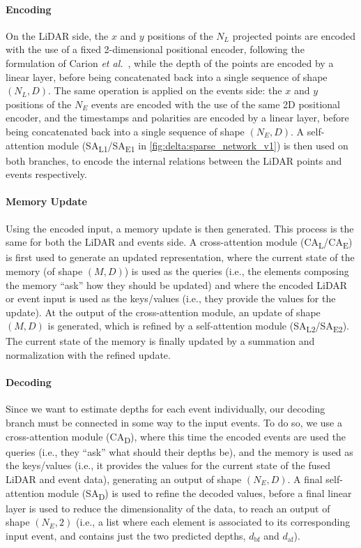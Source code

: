 \paragraph{Encoding}\label{sec:delta:sparse_network_v1:encoding}
On the LiDAR side, the \(x\) and \(y\) positions of the \(N_L\) projected points are encoded with the use of a fixed 2-dimensional positional encoder, following the formulation of Carion \textit{et al.}~\cite{Carion2020EndtoEndOD}, while the depth of the points are encoded by a linear layer, before being concatenated back into a single sequence of shape \((N_L, D)\). The same operation is applied on the events side: the \(x\) and \(y\) positions of the \(N_E\) events are encoded with the use of the same 2D positional encoder, and the timestamps and polarities are encoded by a linear layer, before being concatenated back into a single sequence of shape \((N_E, D)\). A self-attention module (SA\textsubscript{L1}/SA\textsubscript{E1} in \cref{fig:delta:sparse_network_v1}) is then used on both branches, to encode the internal relations between the LiDAR points and events respectively.

\paragraph{Memory Update}
Using the encoded input, a memory update is then generated. This process is the same for both the LiDAR and events side. A cross-attention module (CA\textsubscript{L}/CA\textsubscript{E}) is first used to generate an updated representation, where the current state of the memory (of shape \((M, D)\)) is used as the queries (i.e., the elements composing the memory ``ask'' how they should be updated) and where the encoded LiDAR or event input is used as the keys/values (i.e., they provide the values for the update). At the output of the cross-attention module, an update of shape \((M, D)\) is generated, which is refined by a self-attention module (SA\textsubscript{L2}/SA\textsubscript{E2}). The current state of the memory is finally updated by a summation and normalization with the refined update.

\paragraph{Decoding}
Since we want to estimate depths for each event individually, our decoding branch must be connected in some way to the input events. To do so, we use a cross-attention module (CA\textsubscript{D}), where this time the encoded events are used the queries (i.e., they ``ask'' what should their depths be), and the memory is used as the keys/values (i.e., it provides the values for the current state of the fused LiDAR and event data), generating an output of shape \((N_E, D)\). A final self-attention module (SA\textsubscript{D}) is used to refine the decoded values, before a final linear layer is used to reduce the dimensionality of the data, to reach an output of shape \((N_E, 2)\) (i.e., a list where each element is associated to its corresponding input event, and contains just the two predicted depths, \(d_\text{bf}\) and \(d_\text{af}\)).

